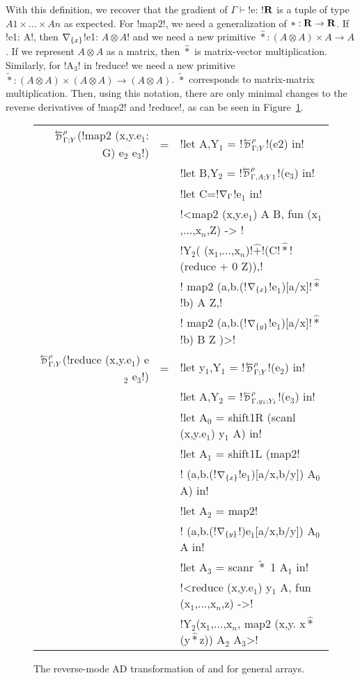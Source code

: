 With this definition, we recover that the gradient of $\Gamma \vdash$!e: !$\mathbf{R}$ is a tuple of type $A1\times\ldots\times An$ as expected.
For !map2!, we need a generalization of $*:\mathbf{R}\to\mathbf{R}$. 
If !e1: A!, then $\nabla_{\{x\}}$!e1: $A\otimes A$! and we need a new primitive $\widehat{*}:(A\otimes A) \times A \to A$.
If we represent $A\otimes A$ as a matrix, then $\widehat{*}$ is matrix-vector multiplication.
Similarly, for !A$_{3}$! in !reduce! we need a new primitive $\widetilde{*}:(A\otimes A)\times(A\otimes A) \to (A\otimes A)$.
$\widetilde{*}$ corresponds to matrix-matrix multiplication.
Then, using this notation, there are only minimal changes to the reverse derivatives of !map2! and !reduce!, as can be seen in Figure~\ref{fig:lift_gen_arr}.

\begin{figure}
\begin{center}
\begin{tabular}{|r c l|}
\hline
    $\directD{\rho}{\Gamma}{Y}$(!map2 (x,y.e$_1$: G) e$_2$ e$_3$!) &=&  
    !let A,Y$_1$ = !$\directD{\rho}{\Gamma}{Y}$!(e2) in! \\
    && !let B,Y$_2$ = !$\directD{\rho}{\Gamma,A}{Y1}$!(e$_3$) in! \\
    && !let C=!$\nabla_{\Gamma}$!e$_1$ in!\\
    && !<map2 (x,y.e$_1$) A B, fun (x$_1$,$\ldots$,x$_n$,Z) -> !\\
    && !Y$_2$( (x$_1$,$\ldots$,x$_n$)!$\widehat{+}$!(C!$\widehat{*}$!(reduce + 0 Z)),!\\
    && \quad\quad! map2 (a,b.(!$\nabla_{\{x\}}$!e$_1$)[a/x]!$\widehat{*}$!b) A Z,!\\
    && \quad\quad! map2 (a,b.(!$\nabla_{\{y\}}$!e$_1$)[a/x]!$\widehat{*}$!b) B Z )>!\\
    $\directD{\rho}{\Gamma}{Y}$(!reduce (x,y.e$_{1}$) e$_{2}$ e$_{3}$!) &=&
    !let y$_{1}$,Y$_{1}$ = !$\directD{\rho}{\Gamma}{Y}$!(e$_{2}$) in! \\
    && !let A,Y$_{2}$ = !$\directD{\rho}{\Gamma,y_1}{Y_1}$!(e$_{3}$) in! \\
    && !let A$_{0}$ = shift1R (scanl (x,y.e$_{1}$) y$_{1}$ A) in! \\
    && !let A$_{1}$ = shift1L (map2! \\ 
    && !      (a,b.(!$\nabla_{\{x\}}$!e$_{1}$)[a/x,b/y]) A$_{0}$ A) in! \\
    && !let A$_{2}$ = map2! \\
    && !      (a,b.(!$\nabla_{\{y\}}$!)e$_{1}$[a/x,b/y]) A$_{0}$ A in! \\
    && !let A$_{3}$ = scanr $\widetilde{*}$ 1 A$_{1}$ in! \\
    && !<reduce (x,y.e$_{1}$) y$_{1}$ A, fun (x$_{1}$,$\ldots$,x$_n$,z) ->! \\
    && !Y$_{2}$(x$_{1}$,$\ldots$,x$_n$, map2 (x,y. x$\widehat{*}$(y$\widehat{*}$z)) A$_{2}$ A$_{3}$>! \\ \hline
\end{tabular}
\end{center}
\caption{The reverse-mode AD transformation of  and  for general arrays.}
\label{fig:lift_gen_arr}
\end{figure}

